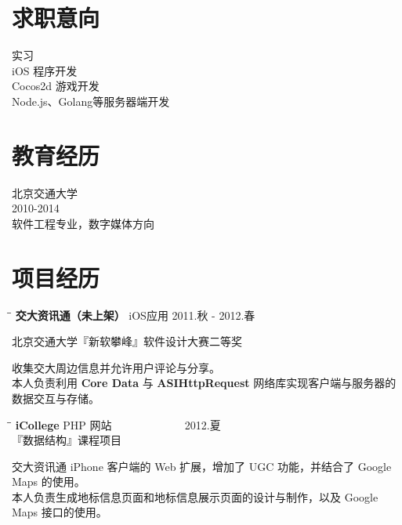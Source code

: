 \documentclass{res}
\begin{document}
\begin{resume}

\section{求职意向}
\noindent
    实习\\
    iOS 程序开发\\
    Cocos2d 游戏开发\\
    Node.js、Golang等服务器端开发\\

\section{教育经历}
\noindent
    北京交通大学\\
    2010-2014\\
    软件工程专业，数字媒体方向\\


\section{项目经历}
    \vspace{-0.1in}

    \begin{tabbing}
      \hspace{2.3in}\= \hspace{2.6in}\= \kill %
      {\bf 交大资讯通（未上架）} \>  iOS应用  \>2011.秋 - 2012.春\\
                          \centerline{北京交通大学『新软攀峰』软件设计大赛二等奖}
    \end{tabbing}\vspace{-20pt}      %
    收集交大周边信息并允许用户评论与分享。\\
    本人负责利用 {\bf Core Data} 与 {\bf ASIHttpRequest} 网络库实现客户端与服务器的数据交互与存储。

    \begin{tabbing}
      \hspace{2.3in}\= \hspace{2.6in}\= \kill %
      {\bf iCollege} \>  PHP 网站  \> ~~~~~~~~~~~~ 2012.夏\\
                          \>『数据结构』课程项目
    \end{tabbing}\vspace{-20pt}      %
    交大资讯通 iPhone 客户端的 Web 扩展，增加了 UGC 功能，并结合了 Google Maps 的使用。\\
    本人负责生成地标信息页面和地标信息展示页面的设计与制作，以及 Google Maps 接口的使用。


\end{resume}
\end{document}
